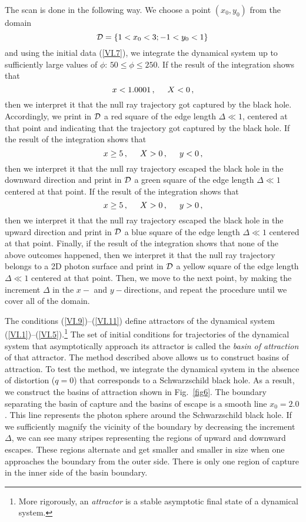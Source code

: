\documentclass[twocolumn,showpacs,preprintnumbers,amsmath,amssymb,floatfix,nofootinbib]{revtex4-1}
\newcommand{\be}{\begin{equation}}
\newcommand{\ee}{\end{equation}}
\newcommand{\eq}[1]{(\ref{#1})}
\newcommand{\n}[1]{\label{#1}}
\newcommand{\hhh}{\, ,\hspace{0.5cm}}
\begin{document}
The scan is done in the following way. We choose a point $(x_0,y_0)$ from the domain 
\be\n{VI.8}
{\cal D}=\{1<x_0<3; -1<y_0<1\}\,
\ee
and using the initial data \eq{VI.7}, we integrate the dynamical system up to sufficiently large values of $\phi:\,50\leq\phi\leq250$. If the result of the integration shows that 
\be\n{VI.9}
x<1.0001\hhh X<0\,,
\ee
then we interpret it that the null ray trajectory got captured by the black hole. Accordingly, we print in ${\cal D}$ a red square of the edge length $\Delta\ll1$, centered at that point and indicating that the trajectory got captured by the black hole. If the result of the integration shows that     
\be\n{VI.10} 
x\geq5\hhh X>0\hhh y<0\,,
\ee 
then we interpret it that the null ray trajectory escaped the black hole in the downward direction and print in ${\cal D}$ a green square of the edge length $\Delta\ll1$ centered at that point. If the result of the integration shows that   
\be\n{VI.11}
x\geq5\hhh X>0\hhh y>0\,,
\ee 
then we interpret it that the null ray trajectory escaped the black hole in the upward direction and print in ${\cal D}$ a blue square of the edge length $\Delta\ll1$ centered at that point. Finally, if the result of the integration shows that none of the above outcomes happened, then we interpret it that the null ray trajectory belongs to a 2D photon surface and print in ${\cal D}$ a yellow square of the edge length $\Delta\ll1$ centered at that point. Then, we move to the next point, by making the increment $\Delta$ in the $x-$ and $y-$directions, and repeat the procedure until we cover all of the domain. 

The conditions \eq{VI.9}--\eq{VI.11} define attractors of the dynamical system \eq{VI.1}--\eq{VI.5}.\footnote{More rigorously, an {\em attractor} is a stable asymptotic final state of a dynamical system.} The set of initial conditions for trajectories of the dynamical system that asymptotically approach its attractor is called the {\em basin of attraction} of that attractor. The method described above allows us to construct basins of attraction. To test the method, we integrate the dynamical system in the absence of distortion ($q=0$) that corresponds to a Schwarzschild black hole. As a result, we construct the basins of attraction shown in Fig.~\ref{fig6}. The boundary separating the basin of capture and the basins of escape is a smooth line $x_0=2.0$. This line represents the photon sphere around the Schwarzschild black hole. If we sufficiently magnify the vicinity of the boundary by decreasing the increment $\Delta$, we can see many stripes representing the regions of upward and downward escapes. These regions alternate and get smaller and smaller in size when one approaches the boundary from the outer side. There is only one region of capture in the inner side of the basin boundary.
\end{document}

